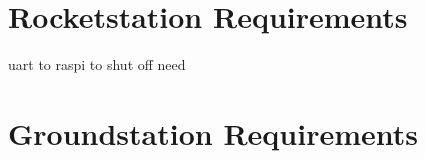 \documentclass{book}
\begin{document}
\section{Rocketstation Requirements}
\par uart to raspi to shut off need
\section{Groundstation Requirements}





%

%
%
\end{document}

